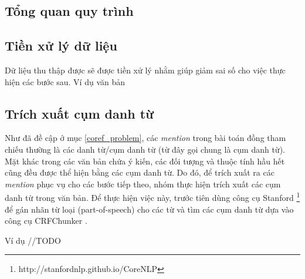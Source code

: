 \documentclass[12pt]{extarticle}
\begin{document}
		\subsection{Tổng quan quy trình}
			\begin{figure}[H]
				\centering				
				
			\end{figure}
		\subsection{Tiền xử lý dữ liệu}
		\par Dữ liệu thu thập được sẽ được tiền xử lý nhằm giúp giảm sai số cho việc thực hiện các bước sau. Ví dụ văn bản
		\subsection{Trích xuất cụm danh từ}
			\par Như đã đề cập ở mục \ref{coref_problem}, các \textit{mention} trong bài toán đồng tham chiếu thường là các danh từ/cụm danh từ (từ đây gọi chung là cụm danh từ). Mặt khác trong các văn bản chứa ý kiến, các đối tượng và thuộc tính hầu hết cũng đều được thể hiện bằng các cụm danh từ. Do đó, để trích xuất ra các \textit{mention} phục vụ cho các bước tiếp theo, nhóm thực hiện trích xuất các cụm danh từ trong văn bản. Để thực hiện việc này, trước tiên dùng công cụ Stanford \footnote{http://stanfordnlp.github.io/CoreNLP} để gán nhãn từ loại (part-of-speech) cho các từ và tìm các cụm danh từ dựa vào công cụ CRFChunker \cite{crfchunker}. 
			\par Ví dụ //TODO
\end{document}
